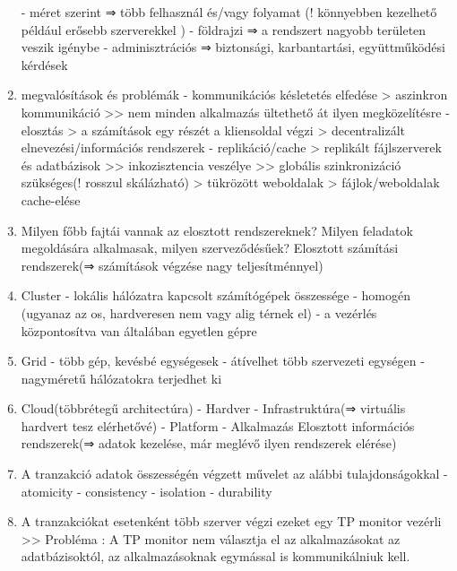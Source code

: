 \documentclass[twoside, a4paper, 12pt]{article}
\begin{document}
\begin{enumerate}
                - méret szerint   ⇒ több felhasznál és/vagy folyamat  (! könnyebben kezelhető például erősebb szerverekkel )
                - földrajzi       ⇒ a rendszert nagyobb területen veszik igénybe
                - adminisztrációs ⇒ biztonsági, karbantartási, együttműködési kérdések
            \item megvalósítások és problémák 
                - kommunikációs késletetés elfedése 
                > aszinkron kommunikáció >> nem minden alkalmazás ültethető át ilyen megközelítésre
                - elosztás 
                > a számítások egy részét a kliensoldal végzi
                > decentralizált elnevezési/információs rendszerek
                - replikáció/cache
                > replikált fájlszerverek és adatbázisok >> inkozisztencia veszélye >> globális szinkronizáció szükséges(! rosszul skálázható)
                > tükrözött weboldalak
                > fájlok/weboldalak cache-elése
            \item  Milyen főbb fajtái vannak az elosztott rendszereknek? Milyen feladatok megoldására alkalmasak, milyen szerveződésűek?
                Elosztott számítási rendszerek(⇒ számítások végzése nagy teljesítménnyel)
            \item Cluster
                - lokális hálózatra kapcsolt számítógépek összessége 
                - homogén (ugyanaz az os, hardveresen nem vagy alig térnek el)
                - a vezérlés központosítva van általában egyetlen gépre
            \item Grid
                - több gép, kevésbé egységesek
                - átívelhet több szervezeti egységen 
                - nagyméretű hálózatokra terjedhet ki 
            \item Cloud(többrétegű architectúra)
                - Hardver
                - Infrastruktúra(⇒ virtuális hardvert tesz elérhetővé)
                - Platform
                - Alkalmazás
                Elosztott információs rendszerek(⇒  adatok kezelése, már meglévő ilyen rendszerek elérése)
            \item A tranzakció adatok összességén végzett művelet az alábbi tulajdonságokkal
                - atomicity
                - consistency
                - isolation
                - durability
            \item A tranzakciókat esetenként több szerver végzi ezeket egy TP monitor vezérli 
                >> Probléma :  A TP monitor nem választja el az alkalmazásokat az adatbázisoktól,  az alkalmazásoknak egymással is kommunikálniuk kell.

\end{enumerate}
\end{document}
